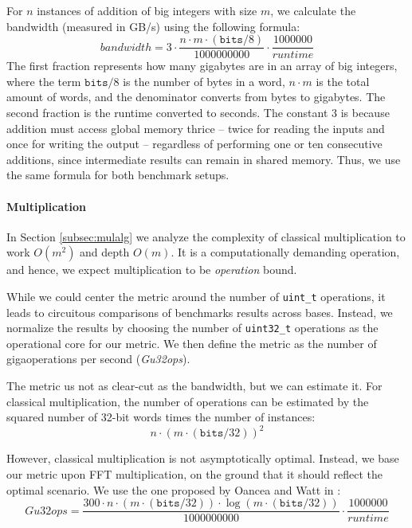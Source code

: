 For $n$ instances of addition of big integers with size $m$, we calculate the
bandwidth (measured in GB/s) using the following formula:
\begin{equation}
    \label{eq:bandwidth}
    \mathit{bandwidth} = 3 \cdot \dfrac{n \cdot m \cdot (\mathtt{bits}/8)}{1000000000} \cdot \dfrac{1000000}{\mathit{runtime}}
\end{equation}
The first fraction represents how many gigabytes are in an array of big
integers, where the term $\mathtt{bits} / 8$ is the number of bytes in a word,
$n\cdot m$ is the total amount of words, and the denominator converts from bytes to
gigabytes. The second fraction is the runtime converted to seconds. The constant
3 is because addition must access global memory thrice -- twice for reading the
inputs and once for writing the output -- regardless of performing one or ten
consecutive additions, since intermediate results can remain in shared
memory. Thus, we use the same formula for both benchmark setups.


\paragraph{Multiplication}
In Section \ref{subsec:mulalg} we analyze the complexity of classical
multiplication to work $O(m^2)$ and depth $O(m)$. It is a computationally
demanding operation, and hence, we expect multiplication to be
\textit{operation} bound.

While we could center the metric around the number of \texttt{uint\_t}
operations, it leads to circuitous comparisons of benchmarks results across
bases. Instead, we normalize the results by choosing the number of
\texttt{uint32\_t} operations as the operational core for our metric. We then
define the metric as the number of gigaoperations per second (\textit{Gu32ops}).

The metric us not as clear-cut as the bandwidth, but we can estimate it. For
classical multiplication, the number of operations can be estimated by the
squared number of 32-bit words times the number of instances:
\begin{equation}
  \label{eq:u32opsobs}
  {n \cdot (m \cdot (\mathtt{bits} / 32))^2}
\end{equation}

However, classical multiplication is not asymptotically optimal. Instead, we
base our metric upon FFT multiplication, on the ground that it should reflect
the optimal scenario. We use the one proposed by Oancea and Watt in
\cite{oancea2024gpu}:
\begin{equation}
  \label{eq:u32ops}
  \mathit{Gu32ops} = \dfrac{300 \cdot n \cdot (m \cdot (\mathtt{bits} / 32)) \cdot \log (m \cdot (\mathtt{bits} / 32))}{1000000000} \cdot \dfrac{1000000}{\mathit{runtime}}
\end{equation}

